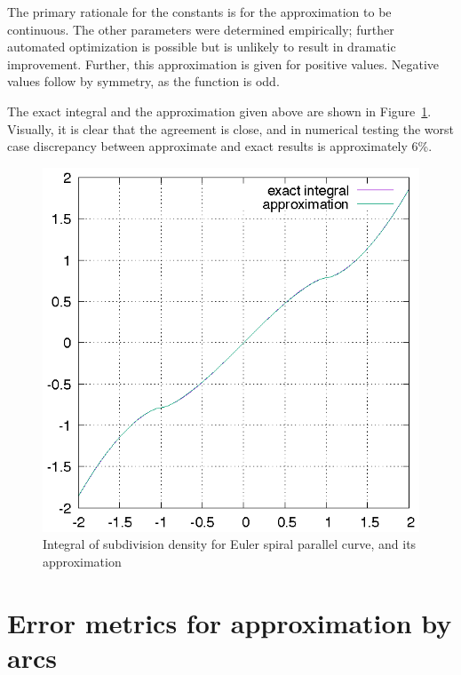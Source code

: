 \documentclass[sigconf, authordraft]{acmart}
\begin{document}
The primary rationale for the constants is for the approximation to be continuous. The other parameters were determined empirically; further automated optimization is possible but is unlikely to result in dramatic improvement. Further, this approximation is given for positive values. Negative values follow by symmetry, as the function is odd.

The exact integral and the approximation given above are shown in Figure~\ref{fig:espc}. Visually, it is clear that the agreement is close, and in numerical testing the worst case discrepancy between approximate and exact results is approximately 6\%.

\begin{figure}
    \includegraphics[scale=0.8]{espc}
    \caption{Integral of subdivision density for Euler spiral parallel curve, and its approximation}
    \label{fig:espc}
\end{figure}

\section{Error metrics for approximation by arcs}
\end{document}
